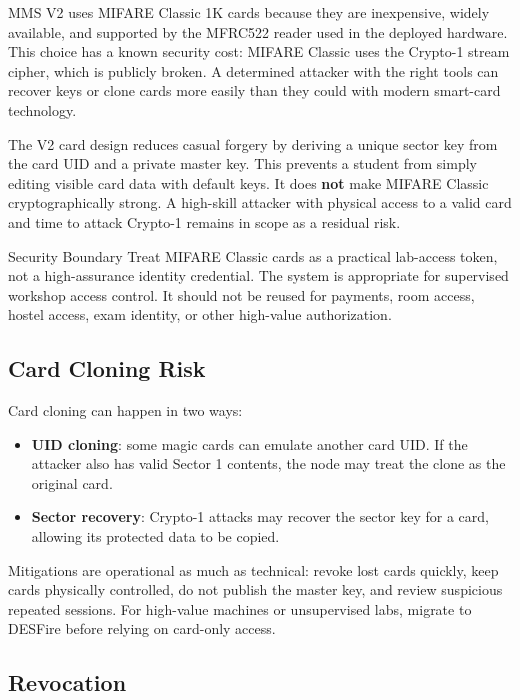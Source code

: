 MMS V2 uses MIFARE Classic 1K cards because they are inexpensive, widely available, and supported by the MFRC522 reader used in the deployed hardware. This choice has a known security cost: MIFARE Classic uses the Crypto-1 stream cipher, which is publicly broken. A determined attacker with the right tools can recover keys or clone cards more easily than they could with modern smart-card technology.

The V2 card design reduces casual forgery by deriving a unique sector key from the card UID and a private master key. This prevents a student from simply editing visible card data with default keys. It does \textbf{not} make MIFARE Classic cryptographically strong. A high-skill attacker with physical access to a valid card and time to attack Crypto-1 remains in scope as a residual risk.

\begin{riskbox}{Security Boundary}
Treat MIFARE Classic cards as a practical lab-access token, not a high-assurance identity credential. The system is appropriate for supervised workshop access control. It should not be reused for payments, room access, hostel access, exam identity, or other high-value authorization.
\end{riskbox}

\subsection{Card Cloning Risk}

Card cloning can happen in two ways:
\begin{itemize}[leftmargin=1.5em]
    \item \textbf{UID cloning}: some magic cards can emulate another card UID. If the attacker also has valid Sector 1 contents, the node may treat the clone as the original card.
    \item \textbf{Sector recovery}: Crypto-1 attacks may recover the sector key for a card, allowing its protected data to be copied.
\end{itemize}

Mitigations are operational as much as technical: revoke lost cards quickly, keep cards physically controlled, do not publish the master key, and review suspicious repeated sessions. For high-value machines or unsupervised labs, migrate to DESFire before relying on card-only access.

\subsection{Revocation}


